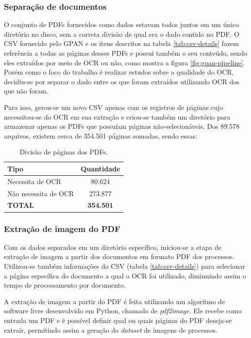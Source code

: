 \subsubsection{Separação de documentos}
O conjunto de PDFs fornecidos como dados estavam todos juntos em um único diretório no disco, sem a correta divisão de qual era o dado contido no PDF. O CSV fornecido pelo GPAN e os itens descritos na tabela \ref{tab:csv-details} fazem referência a todas as páginas desses PDFs e possui também o seu conteúdo, sendo eles extraídos por meio de OCR ou não, como mostra a figura \ref{fig:gpan-pipeline}. Porém como o foco do trabalho é realizar estudos sobre a qualidade do OCR, decidiu-se por separar o dado entre os que foram extraídos utilizando OCR dos que não foram.

Para isso, gerou-se um novo CSV apenas com os registros de páginas cujo necessitou-se do OCR em sua extração e criou-se também um diretório para armazenar apenas os PDFs que possuíam páginas não-selecionáveis. Dos 89.578 arquivos, existem cerca de 354.501 páginas somadas, sendo essas:

\begin{table}[H]
  \centering
  \caption{Divisão de páginas dos PDFs.}
  \begin{tabular}{|m{10em}|c|}
    \hline
      \textbf{Tipo}  &
      \textbf{Quantidade} \\
    \hline
      Necessita de OCR  &
      80.624 \\
    \hline
      Não necessita de OCR  &
      273.877 \\
    \hline
      \textbf{TOTAL}  &
      \textbf{354.501} \\
    \hline
  \end{tabular}
  \label{tab:csv-diff}
\end{table}

\subsubsection{Extração de imagem do PDF}
Com os dados separados em um diretório específico, iniciou-se a etapa de extração de imagem a partir dos documentos em formato PDF dos processos. Utilizou-se também informações do CSV (tabela \ref{tab:csv-details}) para selecionar a página específica do documento a qual o OCR foi utilizado, diminuindo assim o tempo de processamento por documento.

A extração de imagem a partir do PDF é feita utilizando um algoritmo de software livre desenvolvido em Python, chamado de \textit{pdf2image}. Ele recebe como entrada um PDF e é possível definir qual ou quais páginas do PDF deseja-se extrair, permitindo assim a geração do \textit{dataset} de imagens de processos.

